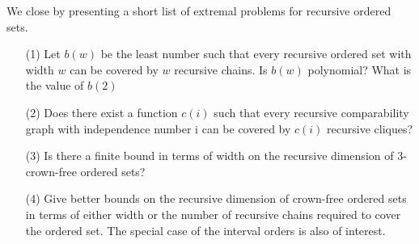 \documentclass[twoside]{article}
\begin{document}
We close by presenting a short list of extremal problems for recursive ordered sets.\\

\begin{itemize}
  \item[(1)] Let $b(w)$ be the least number such that every recursive ordered set with width $w$ can be
  covered by $w$ recursive chains. Is $b(w)$ polynomial? What is the value of $b(2)$\\
  \item[(2)] Does there exist a function $c(i)$ such that every recursive comparability graph with 
  independence number i can be covered by $c(i)$ recursive cliques?\\
  \item[(3)] Is there a finite bound in terms of width on the recursive dimension of 3-crown-free ordered sets?\\
  \item[(4)] Give better bounds on the recursive dimension of crown-free ordered sets in terms of either width 
  or the number of recursive chains required to cover the ordered set. The special case of the interval orders is also of interest.
\end{itemize}


\nocite{*}
\renewcommand\refname{Bibliography}


\end{document}
